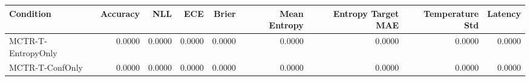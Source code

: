 \begin{tabular}{lrrrrrrrr}
\toprule
Condition & Accuracy & NLL & ECE & Brier & Mean Entropy & Entropy Target MAE & Temperature Std & Latency \\
\midrule
MCTR-T-EntropyOnly & 0.0000 & 0.0000 & 0.0000 & 0.0000 & 0.0000 & 0.0000 & 0.0000 & 0.0000 \\
MCTR-T-ConfOnly & 0.0000 & 0.0000 & 0.0000 & 0.0000 & 0.0000 & 0.0000 & 0.0000 & 0.0000 \\
\bottomrule
\end{tabular}
